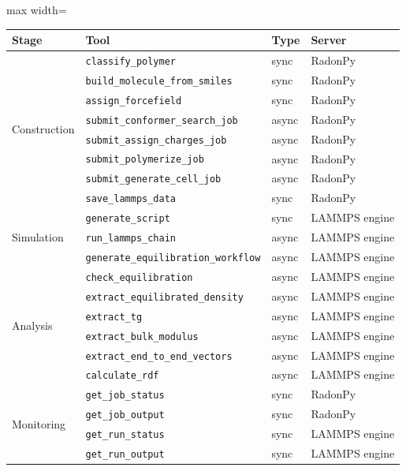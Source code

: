 \documentclass[journal=acsami,manuscript=suppinfo]{achemso}
\begin{document}
\begin{adjustbox}{max width=\textwidth}
\begin{tabular}{llll}
\toprule
\textbf{Stage} & \textbf{Tool} & \textbf{Type} & \textbf{Server} \\
\midrule
\multirow{8}{*}{Construction}
& \texttt{classify\_polymer} & sync & RadonPy \\
& \texttt{build\_molecule\_from\_smiles} & sync & RadonPy \\
& \texttt{assign\_forcefield} & sync & RadonPy \\
& \texttt{submit\_conformer\_search\_job} & async & RadonPy \\
& \texttt{submit\_assign\_charges\_job} & async & RadonPy \\
& \texttt{submit\_polymerize\_job} & async & RadonPy \\
& \texttt{submit\_generate\_cell\_job} & async & RadonPy \\
& \texttt{save\_lammps\_data} & sync & RadonPy \\
\midrule
\multirow{3}{*}{Simulation}
& \texttt{generate\_script} & sync & LAMMPS engine \\
& \texttt{run\_lammps\_chain} & async & LAMMPS engine \\
& \texttt{generate\_equilibration\_workflow} & async & LAMMPS engine \\
\midrule
\multirow{6}{*}{Analysis}
& \texttt{check\_equilibration} & async & LAMMPS engine \\
& \texttt{extract\_equilibrated\_density} & async & LAMMPS engine \\
& \texttt{extract\_tg} & async & LAMMPS engine \\
& \texttt{extract\_bulk\_modulus} & async & LAMMPS engine \\
& \texttt{extract\_end\_to\_end\_vectors} & async & LAMMPS engine \\
& \texttt{calculate\_rdf} & async & LAMMPS engine \\
\midrule
\multirow{4}{*}{Monitoring}
& \texttt{get\_job\_status} & sync & RadonPy \\
& \texttt{get\_job\_output} & sync & RadonPy \\
& \texttt{get\_run\_status} & sync & LAMMPS engine \\
& \texttt{get\_run\_output} & sync & LAMMPS engine \\
\bottomrule
\end{tabular}
\end{adjustbox}
\label{tab:si_tool}
\end{document}
